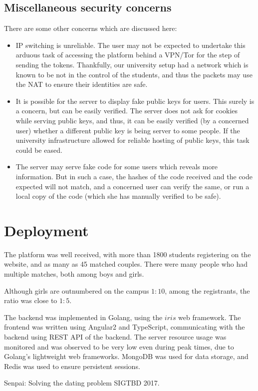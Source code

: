 \documentclass[sigtbd]{sigtbd-style}
\begin{document}
\subsection{Miscellaneous security concerns}
There are some other concerns which are discussed here:
\begin{itemize}
\item IP switching is unreliable. The user may not be expected to
  undertake this arduous task of accessing the platform behind a
  VPN/Tor for the step of sending the tokens. Thankfully, our
  university setup had a network which is known to be not in the
  control of the students, and thus the packets may use the NAT to
  ensure their identities are safe.
\item It is possible for the server to display fake public keys for
  users. This surely is a concern, but can be easily verified. The
  server does not ask for cookies while serving public keys, and thus,
  it can be easily verified (by a concerned user) whether a different
  public key is being server to some people. If the university
  infrastructure allowed for reliable hosting of public keys, this
  task could be eased.
\item The server may serve fake code for some users which reveals more
  information. But in such a case, the hashes of the code received and
  the code expected will not match, and a concerned user can verify
  the same, or run a local copy of the code (which she has manually
  verified to be safe).
\end{itemize}

\section{Deployment}
The platform was well received, with more than 1800 students
registering on the website, and as many as 45 matched couples. There
were many people who had multiple matches, both among boys and girls.

Although girls are outnumbered on the campus $1:10$, among the
registrants, the ratio was close to $1:5$.

The backend was implemented in Golang, using the $iris$ web
framework. The frontend was written using Angular2 and TypeScript,
communicating with the backend using REST API of the backend. The
server resource usage was monitored and was observed to be very low
even during peak times, due to Golang's lightweight web
frameworks. MongoDB was used for data storage, and Redis was used to
ensure persistent sessions.

\begin{thebibliography}{}
\softraggedright
{}
  Senpai: Solving the dating problem
\newblock SIGTBD 2017.

\end{thebibliography}
\end{document}
